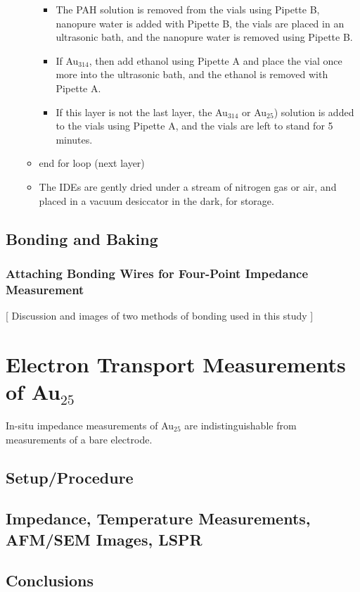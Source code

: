 \documentclass[12pt,oneside,english]{article}
\begin{document}
\begin{itemize}
\begin{itemize}
\begin{itemize}
				\item The PAH solution is removed from the vials using Pipette B,  nanopure water is added with Pipette B, the vials are placed in an ultrasonic bath, and the nanopure water is removed using Pipette B.
				\item If Au$_{314}$, then add ethanol using Pipette A and place the vial once more into the ultrasonic bath, and the ethanol is removed with Pipette A.
				\item If this layer is not the last layer, the Au$_{314}$ or Au$_{25}$) solution is added to the vials using Pipette A, and the vials are left to stand for 5 minutes.
			\end{itemize}
			\item end for loop (next layer)
			\item The IDEs are gently dried under a stream of nitrogen gas or air, and placed in a vacuum desiccator in the dark, for storage.
		\end{itemize}
	\end{itemize}

	\subsection{Bonding and Baking}
	
	\subsubsection{Attaching Bonding Wires for Four-Point Impedance Measurement}
	
	[ Discussion and images of two methods of bonding used in this study ]
	
	
	\section{Electron Transport Measurements of Au$_{25}$}
	In-situ impedance measurements of Au$_{25}$ are indistinguishable from measurements of a bare electrode.
	\subsection{Setup/Procedure}
	
	\subsection{Impedance, Temperature Measurements, AFM/SEM Images, LSPR}
	\subsection{Conclusions}
\end{document}
